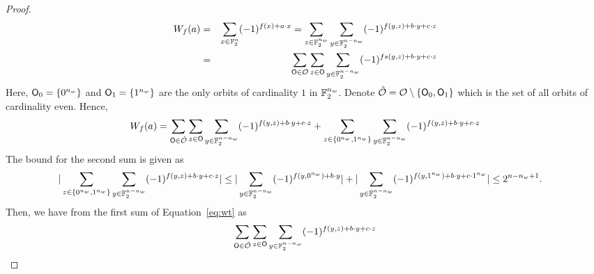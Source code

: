 \documentclass{llncs}
\begin{document}
\begin{proof}
\begin{eqnarray*}
W_{f}(a) & = & \sum_{x\in \mathbb{F}_2^n} (-1)^{f(x)+a \cdot x}
= \sum_{z \in \mathbb{F}_2^{n_w}} \sum_{y \in \mathbb{F}_2^{n-n_w}}(-1)^{f(y,z)+b \cdot y+c \cdot z} \\
& = & \sum_{\mathsf{O} \in \mathcal{O}} \sum_{z \in \mathsf{O}} \sum_{y \in \mathbb{F}_2^{n-n_w}}(-1)^{fs(y,z)+b \cdot y+c \cdot z}
\end{eqnarray*}
Here, $\mathsf{O}_0 = \{0^{n_w}\}$ and $\mathsf{O}_1 = \{1^{n_w}\}$ are the only orbits of cardinality $1$ in $\mathbb{F}_2^{n_w}$. 
Denote $\hat{\mathcal{O}} = \mathcal{O} \setminus \{\mathsf{O}_0,\mathsf{O}_1\}$ which is the set of all orbits of cardinality even. Hence,
\begin{equation}\label{eq:wt}
W_{f}(a) = \sum_{\mathsf{O} \in \hat{\mathcal{O}}} \sum_{z \in \mathsf{O}} \sum_{y \in \mathbb{F}_2^{n-n_w}} (-1)^{f(y,z) + b\cdot y + c\cdot z} + \sum_{z \in \{0^{n_w}, 1^{n_w}\}} \sum_{y \in \mathbb{F}_2^{n-n_w}}(-1)^{f(y,z) + b\cdot y + c \cdot z}
\end{equation}	
The bound for the second sum is given as 
\begin{align*}
|\sum_{z \in \{0^{n_w}, 1^{n_w}\}} \sum_{y \in \mathbb{F}_2^{n-n_w}}(-1)^{f(y,z) + b\cdot y + c \cdot z}|
      & \leq |\sum_{y \in \mathbb{F}_2^{n-n_w}} (-1)^{f(y,0^{n_w})+b \cdot y}| + |\sum_{y \in \mathbb{F}_2^{n-n_w}} (-1)^{f(y,1^{n_w})+b \cdot y + c \cdot 1^{n_w}}|  \leq   2^{n-n_w+1}.
\end{align*}
Then, we have from the first sum of Equation~\ref{eq:wt} as 
\begin{align*}
\sum_{\orb \in \hat{\orbs}} \sum_{z \in \orb} \sum_{y \in \F_2^{n-n_w}} (-1)^{f(y,z) + b\cdot y + c\cdot z}

\end{align*}
\end{proof}
\end{document}
